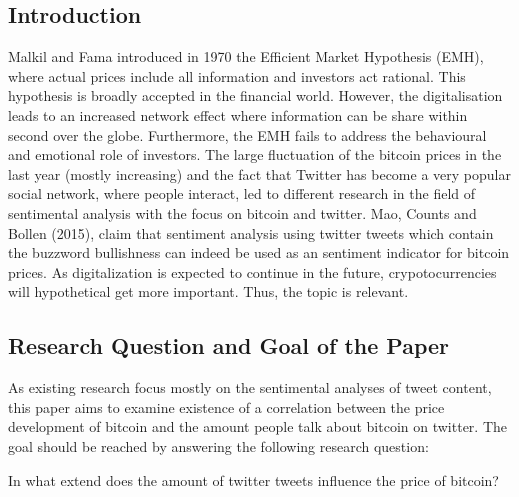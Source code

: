 \documentclass[a4paper,american,12pt]{article}
\begin{document}
\begin{spacing}{1.2}
\cleardoublepage{}
\section{Introduction}
Malkil and Fama introduced in 1970 the Efficient Market Hypothesis (EMH), where actual prices include all information and investors act rational. This hypothesis is broadly accepted in the financial world. However, the digitalisation leads to an increased network effect where information can be share within second over the globe. Furthermore, the EMH fails to address the behavioural and emotional role of investors. The large fluctuation of the bitcoin prices in the last year (mostly increasing) and the fact that Twitter has become a very popular social network, where people interact, led to different research in the field of sentimental analysis with the focus on bitcoin and twitter. Mao, Counts and Bollen (2015), claim that sentiment analysis using twitter tweets which contain the buzzword bullishness can indeed be used as an sentiment indicator for bitcoin prices. As digitalization is expected to continue in the future, crypotocurrencies will hypothetical get more important. Thus, the topic is relevant.

\subsection{Research Question and Goal of the Paper}
As existing research focus mostly on the sentimental analyses of tweet content, this paper aims to examine existence of a correlation between the price development of bitcoin and the amount people talk about bitcoin on twitter. The goal should be reached by answering the following research question:

In what extend does the amount of twitter tweets influence the price of bitcoin?


\end{spacing}
\end{document}

